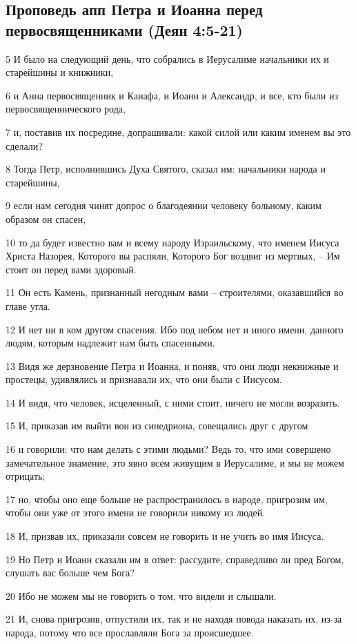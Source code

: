 \subsection*{Проповедь апп Петра и Иоанна перед первосвященниками (Деян 4:5-21)}

5 И было на следующий день, что собрались в Иерусалиме начальники их и старейшины и книжники,

6 и Анна первосвященник и Каиафа, и Иоанн и Александр, и все, кто были из первосвященнического рода,

7 и, поставив их посредине, допрашивали: какой силой или каким именем вы это сделали?

8 Тогда Петр, исполнившись Духа Святого, сказал им: начальники народа и старейшины,

9 если нам сегодня чинят допрос о благодеянии человеку больному, каким образом он спасен,

10 то да будет известно вам и всему народу Израильскому, что именем Иисуса Христа Назорея, Которого вы распяли, Которого Бог воздвиг из мертвых, – Им стоит он перед вами здоровый.

11 Он есть Камень, признанный негодным вами – строителями, оказавшийся во главе угла.

12 И нет ни в ком другом спасения. Ибо под небом нет и иного имени, данного людям, которым надлежит нам быть спасенными.

13 Видя же дерзновение Петра и Иоанна, и поняв, что они люди некнижные и простецы, удивлялись и признавали их, что они были с Иисусом.

14 И видя, что человек, исцеленный, с ними стоит, ничего не могли возразить.

15 И, приказав им выйти вон из синедриона, совещались друг с другом

16 и говорили: что нам делать с этими людьми? Ведь то, что ими совершено замечательное знамение, это явно всем живущим в Иерусалиме, и мы не можем отрицать;

17 но, чтобы оно еще больше не распространилось в народе, пригрозим им, чтобы они уже от этого имени не говорили никому из людей.

18 И, призвав их, приказали совсем не говорить и не учить во имя Иисуса.

19 Но Петр и Иоанн сказали им в ответ: рассудите, справедливо ли пред Богом, слушать вас больше чем Бога?

20 Ибо не можем мы не говорить о том, что видели и слышали.

21 И, снова пригрозив, отпустили их, так и не находя повода наказать их, из-за народа, потому что все прославляли Бога за происшедшее.

